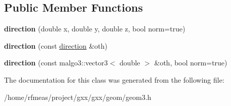 \subsection*{Public Member Functions}
\begin{DoxyCompactItemize}
\item 
{\bfseries direction} (double x, double y, double z, bool norm=true)\hypertarget{classgxx_1_1geom3_1_1direction_a6358587d647d516db1083f64e1fd68da}{}\label{classgxx_1_1geom3_1_1direction_a6358587d647d516db1083f64e1fd68da}

\item 
{\bfseries direction} (const \hyperlink{classgxx_1_1geom3_1_1direction}{direction} \&oth)\hypertarget{classgxx_1_1geom3_1_1direction_ad1915bd7cbea2e42ad61bb1e5362691e}{}\label{classgxx_1_1geom3_1_1direction_ad1915bd7cbea2e42ad61bb1e5362691e}

\item 
{\bfseries direction} (const malgo3\+::vector3$<$ double $>$ \&oth, bool norm=true)\hypertarget{classgxx_1_1geom3_1_1direction_a431eb925ed7a72e7491d149da2b58ab9}{}\label{classgxx_1_1geom3_1_1direction_a431eb925ed7a72e7491d149da2b58ab9}

\end{DoxyCompactItemize}


The documentation for this class was generated from the following file\+:\begin{DoxyCompactItemize}
\item 
/home/rfmeas/project/gxx/gxx/geom/geom3.\+h\end{DoxyCompactItemize}
